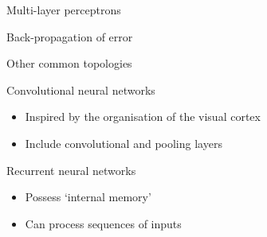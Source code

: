 \begin{frame}{Multi\hyp{}layer perceptrons}
{\begin{block}{Back\hyp{}propagation of error}
\begin{itemize}
            \end{itemize}
        \end{block}}
\end{frame}

\begin{frame}{Other common topologies}
    \begin{block}{Convolutional neural networks}
        \begin{itemize}
            \item Inspired by the organisation of the visual cortex
            \item Include convolutional and pooling layers
        \end{itemize}
    \end{block}
    \vfill
    \begin{block}{Recurrent neural networks}
        \begin{itemize}
            \item Possess `internal memory'
            \item Can process sequences of inputs
        \end{itemize}
    \end{block}
\end{frame}

